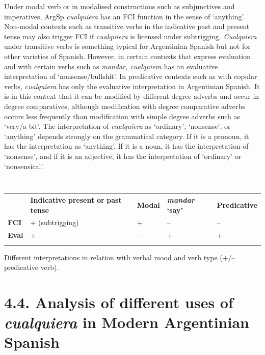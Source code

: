 Under modal verb or in modalised constructions such as subjunctives and imperatives, ArgSp \textit{cualquiera} has an FCI function in the sense of ‘anything’. Non-modal contexts such as transitive verbs in the indicative past and present tense may also trigger FCI if \textit{cualquiera} is licensed under subtrigging. \textit{Cualquiera} under transitive verbs is something typical for Argentinian Spanish but not for other varieties of Spanish. However, in certain contexts that express evaluation and with certain verbs such as \textit{mandar, cualquiera} has an evaluative interpretation of ‘nonsense/bullshit’. In predicative contexts such as with copular verbs, \textit{cualquiera} has only the evaluative interpretation in Argentinian Spanish. It is in this context that it can be modified by different degree adverbs and occur in degree comparatives, although modification with degree comparative adverbs occurs less frequently than modification with simple degree adverbs such as ‘very/a bit’. The interpretation of \textit{cualquiera} as ‘ordinary’, ‘nonsense’, or ‘anything’ depends strongly on the grammatical category. If it is a pronoun, it has the interpretation as ‘anything’. If it is a noun, it has the interpretation of ‘nonsense’, and if it is an adjective, it has the interpretation of ‘ordinary’ or ‘nonsensical’.


\begin{table}
\begin{tabularx}{\textwidth}{XXXXX}
\lsptoprule
\multicolumn{1}{c}{} & \textbf{Indicative} \textbf{present} \textbf{or} \textbf{past} \textbf{tense} & \textbf{Modal} & \textbf{\textit{mandar} }\textbf{‘say’} & \textbf{Predicative}\\
 \textbf{FCI} & + (subtrigging) & + & – & –\\
 \textbf{Eval} & + & – & + & +\\
\lspbottomrule
\end{tabularx}
\caption{\label{tab:} ~}Different interpretations in relation with verbal mood and verb type (+/– predicative verb).
\end{table}

\section{\textbf{4.4.} \textbf{Analysis} \textbf{of} \textbf{different} \textbf{uses} \textbf{of} \textbf{\textit{cualquiera}}\textbf{ }\textbf{in} \textbf{Modern} \textbf{Argentinian} \textbf{Spanish}}

